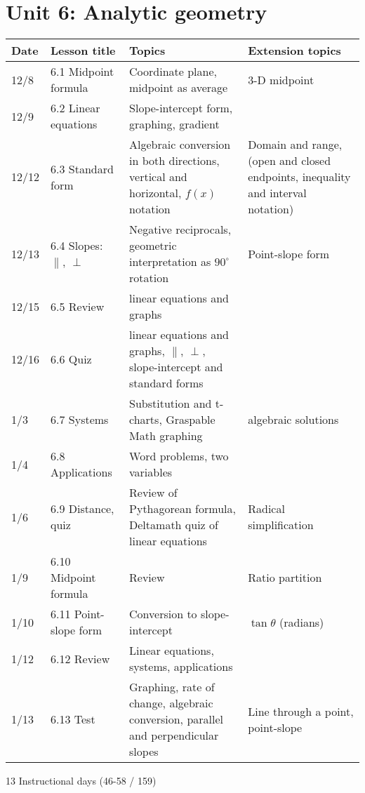 \section*{Unit 6: Analytic geometry}
\begin{tabular}{|p{0.9cm}|p{4cm}|p{7cm}|p{5cm}|}
  \hline
  Date & Lesson title & Topics  & Extension topics \\
  \hline
  12/8 & 6.1 Midpoint formula & Coordinate plane, midpoint as average & 3-D midpoint \\
  \hline
  12/9 & 6.2 Linear equations & Slope-intercept form, graphing, gradient &  \\
  \hline
  12/12 & 6.3 Standard form & Algebraic conversion in both directions, vertical and horizontal, $f(x)$ notation & Domain and range, (open and closed endpoints, inequality and interval notation) \\
  \hline
  12/13 & 6.4 Slopes: $\parallel$, $\perp$ & Negative reciprocals, geometric interpretation as $90^\circ$ rotation & Point-slope form \\
  \hline
  12/15 & 6.5 Review & linear equations and graphs &  \\
  \hline
  12/16 & 6.6 Quiz & linear equations and graphs, $\parallel$, $\perp$, slope-intercept and standard forms & \\
  \hline
  1/3 & 6.7 Systems & Substitution and t-charts, Graspable Math graphing & algebraic solutions \\
  \hline
  1/4 & 6.8 Applications & Word problems, two variables &  \\
  \hline
  1/6 & 6.9 Distance, quiz & Review of Pythagorean formula, Deltamath quiz of linear equations & Radical simplification \\
  \hline
  1/9 & 6.10 Midpoint formula & Review & Ratio partition \\
  \hline
  1/10 & 6.11 Point-slope form & Conversion to slope-intercept & $\tan \theta$ (radians) \\
  \hline
  1/12 & 6.12 Review & Linear equations, systems, applications &  \\
  \hline
  1/13 & 6.13 Test & Graphing, rate of change, algebraic conversion, parallel and perpendicular slopes & Line through a point, point-slope \\
  \hline

\end{tabular} \par \vspace*{0.3cm}
13 Instructional days (46-58 / 159)



